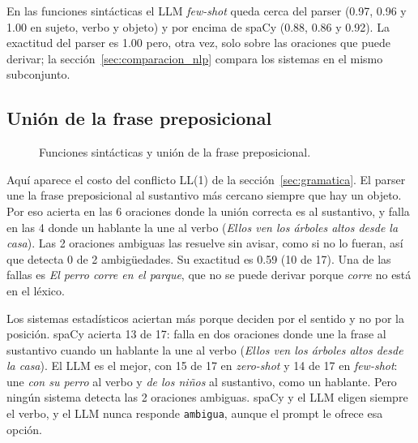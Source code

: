 En las funciones sintácticas el LLM \emph{few-shot} queda cerca del parser (0.97, 0.96 y 1.00
en sujeto, verbo y objeto) y por encima de spaCy (0.88, 0.86 y 0.92). La exactitud del parser
es 1.00 pero, otra vez, solo sobre las oraciones que puede derivar; la
sección~\ref{sec:comparacion_nlp} compara los sistemas en el mismo subconjunto.

\subsection{Unión de la frase preposicional}

\begin{table}[h]
  \centering
  \small
  \par\medskip
  \caption{Unión de la primera frase preposicional en las 17 oraciones que la tienen.}
  \label{tab:pp}
\end{table}

\begin{figure}[h]
  \centering
  \caption{Funciones sintácticas y unión de la frase preposicional.}
  \label{fig:funciones_pp}
\end{figure}

Aquí aparece el costo del conflicto LL(1) de la sección~\ref{sec:gramatica}. El parser une la
frase preposicional al sustantivo más cercano siempre que hay un objeto. Por eso acierta en
las 6 oraciones donde la unión correcta es al sustantivo, y falla en las 4 donde un hablante la
une al verbo (\emph{Ellos ven los árboles altos desde la casa}). Las 2 oraciones ambiguas las
resuelve sin avisar, como si no lo fueran, así que detecta 0 de 2 ambigüedades. Su exactitud es
0.59 (10 de 17). Una de las fallas es \emph{El perro corre en el parque}, que no se puede
derivar porque \emph{corre} no está en el léxico.

Los sistemas estadísticos aciertan más porque deciden por el sentido y no por la posición. spaCy
acierta 13 de 17: falla en dos oraciones donde une la frase al sustantivo cuando un hablante la
une al verbo (\emph{Ellos ven los árboles altos desde la casa}). El LLM es el mejor, con 15 de 17
en \emph{zero-shot} y 14 de 17 en \emph{few-shot}: une \emph{con su perro} al verbo y \emph{de
los niños} al sustantivo, como un hablante. Pero ningún sistema detecta las 2 oraciones
ambiguas. spaCy y el LLM eligen siempre el verbo, y el LLM nunca responde \texttt{ambigua},
aunque el prompt le ofrece esa opción.

